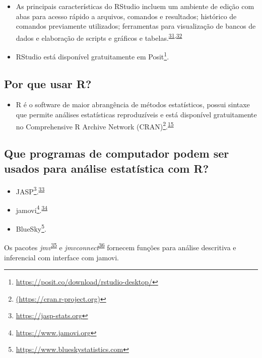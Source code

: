 \documentclass[
  a4paper,
]{book}
\providecommand{\tightlist}{%
  \setlength{\itemsep}{0pt}\setlength{\parskip}{0pt}}
\renewcommand{\href}[2]{#2\footnote{\url{#1}}}
\newenvironment{infobox}[1]
  {
  \begin{itemize}
  \renewcommand{\labelitemi}{
    \raisebox{-.7\height}[0pt][0pt]{
      {\setkeys{Gin}{width=3em,keepaspectratio}
        \texttt{[image: \#1]}}
    }
  }
  \setlength{\fboxsep}{1em}
  \begin{blackbox}
  \item
  }
  {
  \end{blackbox}
  \end{itemize}
  }
\begin{document}
\begin{itemize}
\item
  As principais características do RStudio incluem um ambiente de edição com abas para acesso rápido a arquivos, comandos e resultados; histórico de comandos previamente utilizados; ferramentas para visualização de bancos de dados e elaboração de scripts e gráficos e tabelas.\textsuperscript{\protect\hyperlink{ref-introduc2020}{31},\protect\hyperlink{ref-racine2011}{32}}
\item
  RStudio está disponível gratuitamente em \href{https://posit.co/download/rstudio-desktop/}{Posit}.
\end{itemize}

\hypertarget{por-que-usar-r}{%
\subsection{Por que usar R?}\label{por-que-usar-r}}

\begin{itemize}
\tightlist
\item
  R é o software de maior abrangência de métodos estatísticos, possui sintaxe que permite análises estatísticas reproduzíveis e está disponível gratuitamente no \href{(https://cran.r-project.org)}{Comprehensive R Archive Network (CRAN)}.\textsuperscript{\protect\hyperlink{ref-mair2016}{15}}
\end{itemize}

\hypertarget{que-programas-de-computador-podem-ser-usados-para-anuxe1lise-estatuxedstica-com-r}{%
\subsection{Que programas de computador podem ser usados para análise estatística com R?}\label{que-programas-de-computador-podem-ser-usados-para-anuxe1lise-estatuxedstica-com-r}}

\begin{itemize}
\item
  \href{https://jasp-stats.org}{JASP}.\textsuperscript{\protect\hyperlink{ref-love2019}{33}}
\item
  \href{https://www.jamovi.org}{jamovi}.\textsuperscript{\protect\hyperlink{ref-sahin2020}{34}}
\item
  \href{https://www.blueskystatistics.com}{BlueSky}.
\end{itemize}

\begin{infobox}{images/Rlogo}
Os pacotes \emph{jmv}\textsuperscript{\protect\hyperlink{ref-jmv}{35}} e \emph{jmvconnect}\textsuperscript{\protect\hyperlink{ref-jmvconnect}{36}} fornecem funções para análise descritiva e inferencial com interface com jamovi.

\end{infobox}
\end{document}
